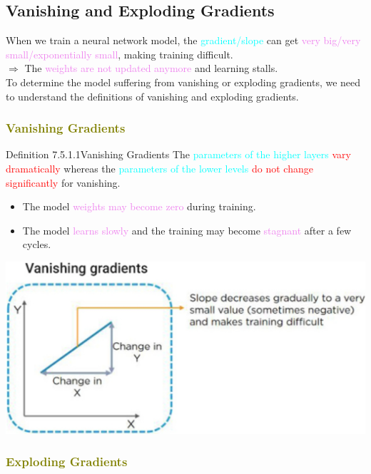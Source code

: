 \documentclass{book}
\begin{document}
\subsection{Vanishing and Exploding Gradients}
When we train a neural network model, the \textcolor{cyan}{gradient/slope} can get \textcolor{violet}{very big/very small/exponentially small}, making training difficult.\\
$\Rightarrow$ The \textcolor{violet}{weights are not updated anymore} and learning stalls.\\
To determine the model suffering from vanishing or exploding gradients, we need to understand the definitions of vanishing and exploding gradients.
\textcolor{olive}{\subsubsection{Vanishing Gradients}}
\begin{defBox}{Definition 7.5.1.1}{Vanishing Gradients}
    The \textcolor{cyan}{parameters of the higher layers} \textcolor{red}{vary dramatically} whereas the \textcolor{cyan}{parameters of the lower levels} \textcolor{red}{do not change significantly} for vanishing.
    \begin{itemize}
        \item The model \textcolor{violet}{weights may become zero} during training.
        \item The model \textcolor{violet}{learns slowly} and the training may become \textcolor{violet}{stagnant} after a few cycles.
    \end{itemize}
    \begin{center}
        \includegraphics[scale=0.15]{chapter 7/ch7_figure21.jpeg}
    \end{center}
\end{defBox}
\textcolor{olive}{\subsubsection{Exploding Gradients}}
\end{document}
